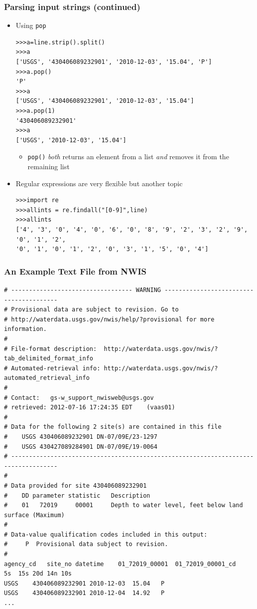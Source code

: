 \documentclass{beamer}
\begin{document}
\begin{frame}[fragile]
\frametitle{Parsing input strings (continued)}
\begin{itemize}
\item Using \texttt{pop}
\begin{lstlisting}
>>>a=line.strip().split()
>>>a
['USGS', '430406089232901', '2010-12-03', '15.04', 'P']
>>>a.pop()
'P'
>>>a
['USGS', '430406089232901', '2010-12-03', '15.04']
>>>a.pop(1)
'430406089232901'
>>>a
['USGS', '2010-12-03', '15.04']
\end{lstlisting}
\begin{itemize} 
\item \texttt{pop()} \emph{both} returns an element from a list \emph{and} removes it from the remaining list
\end{itemize}
\pause
\item Regular expressions are very flexible but another topic 
\begin{lstlisting}
>>>import re
>>>allints = re.findall("[0-9]",line)
>>>allints
['4', '3', '0', '4', '0', '6', '0', '8', '9', '2', '3', '2', '9', '0', '1', '2', 
'0', '1', '0', '1', '2', '0', '3', '1', '5', '0', '4']

\end{lstlisting}

\end{itemize}
\end{frame}

\begin{frame}[fragile]
\frametitle{An Example Text File from NWIS}
\begin{tiny}
\begin{verbatim}
# ---------------------------------- WARNING ----------------------------------------
# Provisional data are subject to revision. Go to
# http://waterdata.usgs.gov/nwis/help/?provisional for more information.
#
# File-format description:  http://waterdata.usgs.gov/nwis/?tab_delimited_format_info
# Automated-retrieval info: http://waterdata.usgs.gov/nwis/?automated_retrieval_info
#
# Contact:   gs-w_support_nwisweb@usgs.gov
# retrieved: 2012-07-16 17:24:35 EDT	(vaas01)
#
# Data for the following 2 site(s) are contained in this file
#    USGS 430406089232901 DN-07/09E/23-1297
#    USGS 430427089284901 DN-07/09E/19-0064
# -----------------------------------------------------------------------------------
#
# Data provided for site 430406089232901
#    DD parameter statistic   Description
#    01   72019     00001     Depth to water level, feet below land surface (Maximum)
#
# Data-value qualification codes included in this output:
#     P  Provisional data subject to revision.
#
agency_cd	site_no	datetime	01_72019_00001	01_72019_00001_cd
5s	15s	20d	14n	10s
USGS	430406089232901	2010-12-03	15.04	P
USGS	430406089232901	2010-12-04	14.92	P
...
\end{verbatim}
\end{tiny}
\end{frame}
\end{document}

